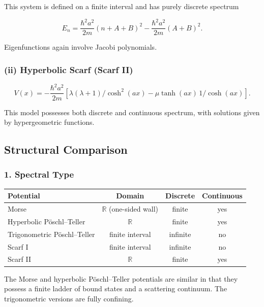 \documentclass[11pt]{article}
\begin{document}
This system is defined on a finite interval and has purely
discrete spectrum

\begin{equation}
E_n
=
\frac{\hbar^2 a^2}{2m}
(n+A+B)^2
-
\frac{\hbar^2 a^2}{2m}
(A+B)^2.
\end{equation}

Eigenfunctions again involve Jacobi polynomials.

\medskip

\subsubsection*{(ii) Hyperbolic Scarf (Scarf II)}

\begin{equation}
V(x)
=
-
\frac{\hbar^2 a^2}{2m}
\left[
    \lambda(\lambda+1)/\cosh^2 (a x)
-
    \mu\tanh (a x)\,1/\cosh (a x)
\right].
\end{equation}

This model possesses both discrete and continuous spectrum,
with solutions given by hypergeometric functions.

\subsection{Structural Comparison}

\subsubsection*{1. Spectral Type}

\begin{center}
\begin{tabular}{lccc}
\hline
Potential & Domain & Discrete & Continuous \\
\hline
Morse & $\mathbb{R}$ (one-sided wall) & finite & yes \\
Hyperbolic Pöschl--Teller & $\mathbb{R}$ & finite & yes \\
Trigonometric Pöschl--Teller & finite interval & infinite & no \\
Scarf I & finite interval & infinite & no \\
Scarf II & $\mathbb{R}$ & finite & yes \\
\hline
\end{tabular}
\end{center}

The Morse and hyperbolic Pöschl--Teller potentials are similar in
that they possess a finite ladder of bound states and a scattering
continuum. The trigonometric versions are fully confining.
\end{document}

